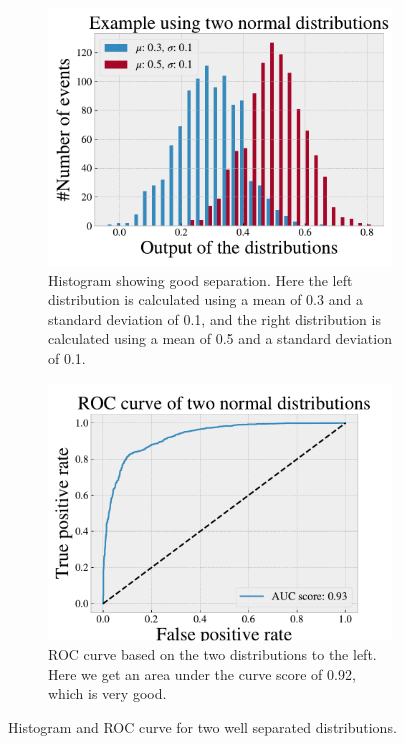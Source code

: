 \begin{figure}[h!]
    \centering
    \begin{subfigure}{.45\textwidth}
        \includegraphics[width=\textwidth]{Figures/Machinelearning/histo_example_Sep.pdf}
        \caption{Histogram showing good separation. Here the left distribution is calculated using a mean of 0.3 and a standard 
        deviation of 0.1, and the right distribution is calculated using a mean of 0.5 and a standard deviation of 0.1.}
        \label{fig:dist_ex_good}
    \end{subfigure}
    \hfill
    \begin{subfigure}{.45\textwidth}
        \includegraphics[width=\textwidth]{Figures/Machinelearning/ROC_curve_example_Sep.pdf}
        \caption{ROC curve based on the two distributions to the left. Here we get an area under the curve score of 0.92, which is very good. }
        \label{fig:ROC_curve_ex_good}
    \end{subfigure}
    \hfill        
    \caption{Histogram and ROC curve for two well separated distributions.}
    \label{fig:roc_example_good}
\end{figure}

